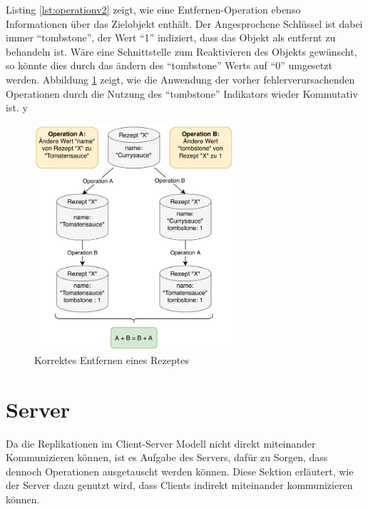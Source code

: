 \documentclass[a4paper, 12pt]{scrreprt}
\begin{document}
\begin{minipage}{\linewidth}
	
\end{minipage}

Listing \ref{lst:operationv2} zeigt, wie eine Entfernen-Operation ebenso Informationen über das Zielobjekt enthält. Der Angesprochene Schlüssel ist dabei immer \enquote{tombstone}, der Wert \enquote{1} indiziert, dass das Objekt als entfernt zu behandeln ist. Wäre eine Schnittstelle zum Reaktivieren des Objekts gewünscht, so könnte dies durch das ändern des \enquote{tombstone} Werts auf \enquote{0} umgesetzt werden. Abbildung \ref{fig:rezeptLöschenGut} zeigt, wie die Anwendung der vorher fehlerverursachenden Operationen durch die Nutzung des \enquote{tombstone} Indikators wieder Kommutativ ist.
y
\begin{figure}[H]
	\centering
	\includegraphics[width=0.66\textwidth]{deleteRecipeGood.png}
	\caption{Korrektes Entfernen eines Rezeptes}
	\label{fig:rezeptLöschenGut}
\end{figure}

\section{Server}

Da die Replikationen im Client-Server Modell nicht direkt miteinander Kommunizieren können, ist es Aufgabe des Servers, dafür zu Sorgen, dass dennoch Operationen ausgetauscht werden können. Diese Sektion erläutert, wie der Server dazu genutzt wird, dass Clients indirekt miteinander kommunizieren können. 
\end{document}
